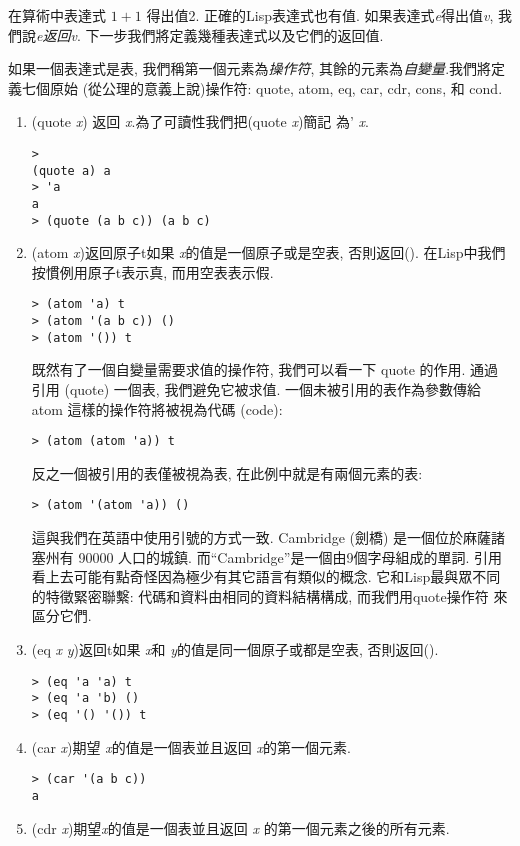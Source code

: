 \documentclass[12pt]{article}
\begin{document}
\begin{CJK}{UTF8}{bsmi}
在算術中表達式 $1 + 1$ 得出值2. 
正確的Lisp表達式也有值. 
如果表達式{\it e}得出值{\it v}, 我們說{\it e}{\em 返回}{\it v}. 
下一步我們將定義幾種表達式以及它們的返回值. 

如果一個表達式是表, 我們稱第一個元素為{\em 操作符}, 其餘的元素為{\em 自變量}.我們將定義七個原始
(從公理的意義上說)操作符: 
quote, atom, eq, car, cdr, cons, 和 cond. 

\begin{enumerate} 
\item 
(quote 
{\it 
x}) 
返回{\it 
x}.為了可讀性我們把(quote 
{\it 
x})簡記 
為'{\it 
x}. 

\begin{verbatim} 
> 
(quote a) a 
> 'a 
a 
> (quote (a b c)) (a b c) 
\end{verbatim} 
\item 
(atom 
{\it 
x})返回原子t如果{\it 
x}的值是一個原子或是空表, 否則返回(). 
在Lisp中我們 
按慣例用原子t表示真, 
而用空表表示假. 
\begin{verbatim} 
> (atom 'a) t 
> (atom '(a b c)) () 
> (atom '()) t 
\end{verbatim} 
既然有了一個自變量需要求值的操作符, 
我們可以看一下 quote 的作用. 
通過引用 (quote) 一個表, 我們避免它被求值. 
一個未被引用的表作為參數傳給 atom 這樣的操作符將被視為代碼 (code): 
\begin{verbatim} 
> (atom (atom 'a)) t 
\end{verbatim} 
反之一個被引用的表僅被視為表, 
在此例中就是有兩個元素的表: 
\begin{verbatim} 
> (atom '(atom 'a)) () 
\end{verbatim} 
這與我們在英語中使用引號的方式一致. 
{\rm Cambridge} (劍橋) 是一個位於麻薩諸塞州有 90000 人口的城鎮. 
而``{\rm Cambridge}''是一個由9個字母組成的單詞. 
引用看上去可能有點奇怪因為極少有其它語言有類似的概念. 
它和Lisp最與眾不同的特徵緊密聯繫: 代碼和資料由相同的資料結構構成, 
而我們用quote操作符 
來區分它們. 
\item 
(eq 
{\it 
x} 
{\it 
y})返回t如果{\it 
x}和{\it 
y}的值是同一個原子或都是空表, 
否則返回(). 
\begin{verbatim} 
> (eq 'a 'a) t 
> (eq 'a 'b) () 
> (eq '() '()) t 
\end{verbatim} 
\item 
(car 
{\it 
x})期望{\it 
x}的值是一個表並且返回{\it 
x}的第一個元素. 
\begin{verbatim} 
> (car '(a b c)) 
a 
\end{verbatim} 
\item 
(cdr {\it x})期望{\it x}的值是一個表並且返回 {\it x} 的第一個元素之後的所有元素. 

\end{enumerate}
\end{CJK}
\end{document}

